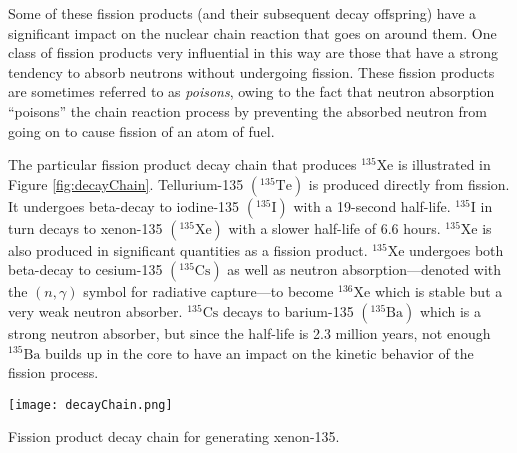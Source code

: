 Some of these fission products (and their subsequent decay offspring) have a significant impact on the nuclear chain reaction that goes on around them.  One class of fission products very influential in this way are those that have a strong tendency to absorb neutrons without undergoing fission.  These fission products are sometimes referred to as \emph{poisons}, owing to the fact that neutron absorption ``poisons'' the chain reaction process by preventing the absorbed neutron from going on to cause fission of an atom of fuel.


The particular fission product decay chain that produces $^{135}$Xe is illustrated in Figure \ref{fig:decayChain}.  Tellurium-135 $\left(^{135}\text{Te}\right)$ is produced directly from fission.  It undergoes beta-decay to iodine-135 $\left(^{135}\text{I}\right)$ with a 19-second half-life.  $^{135}\text{I}$ in turn decays to xenon-135 $\left(^{135}\text{Xe}\right)$ with a slower half-life of 6.6 hours. $^{135}\text{Xe}$ is also produced in significant quantities as a fission product. $^{135}\text{Xe}$ undergoes both beta-decay to cesium-135 $\left(^{135}\text{Cs}\right)$ as well as neutron absorption---denoted with the $(n,\gamma)$ symbol for radiative capture---to become $^{136}\text{Xe}$ which is stable but a very weak neutron absorber.  $^{135}\text{Cs}$ decays to barium-135 $\left(^{135}\text{Ba}\right)$ which is a strong neutron absorber, but since the half-life is 2.3 million years, not enough $^{135}\text{Ba}$ builds up in the core to have an impact on the kinetic behavior of the fission process.
\begin{marginfigure}[-4.0cm]
\texttt{[image: decayChain.png]}
\caption{Fission product decay chain for generating xenon-135.}
\label{fig:decayChain}
\end{marginfigure}


